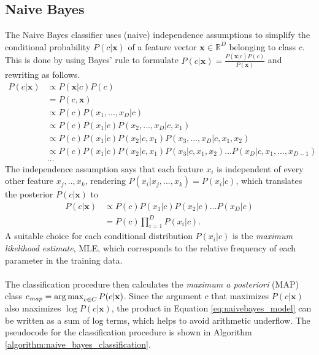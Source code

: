 \subsection{Naive Bayes}
The Naive Bayes classifier uses (naive) independence assumptions to simplify the conditional probability $P(c\vert\mathbf{x})$ of a feature vector $\mathbf{x} \in \mathbb{R}^D$ belonging to class $c$. This is done by using Bayes' rule to formulate $P(c\vert \mathbf{x}) = \frac{P(\mathbf{x}\vert c) P(c)}{P(\mathbf{x})}$ and rewriting as follows.
\begin{align*}
P(c\vert \mathbf{x}) &\propto P(\mathbf{x}\vert c)P(c)
\\&=P(c,\mathbf{x})
\\&\propto P(c) P(x_1,...,x_D\vert c)
\\&\propto P(c) P(x_1\vert c) P(x_2,...,x_D\vert c, x_1)
\\&\propto P(c) P(x_1\vert c) P(x_2\vert c, x_1) P(x_3,...,x_D\vert c,x_1,x_2)
\\&\propto P(c) P(x_1\vert c) P(x_2\vert c, x_1) P(x_3\vert c,x_1,x_2) \dots P(x_D\vert c, x_1,...,x_{D-1})
\\&\dots
\end{align*}
The independence assumption says that each feature $x_i$ is independent of every other feature $x_j,..,x_k$, rendering $P(x_i\vert x_j,...,x_k) = P(x_i\vert c)$, which translates the posterior $P(c\vert \mathbf{x})$ to
\begin{align}
P(c\vert \mathbf{x}) &\propto P(c) P(x_1\vert c) P(x_2\vert c) \dots P(x_D\vert c) \nonumber
\\&= P(c) \prod_{i=1}^{D} P(x_i\vert c).\label{eq:naivebayes_model}
\end{align}
A suitable choice for each conditional distribution $P(x_i\vert c)$ is the \textit{maximum likelihood estimate}, MLE, which corresponds to the relative frequency of each parameter in the training data.
\\\\
The classification procedure then calculates the \textit{maximum a posteriori} (MAP) class $c_{\textit{map}} = \operatorname*{arg\,max}_{c\in C} P(c\vert \mathbf{x})$. Since the argument $c$ that maximizes $P(c\vert \mathbf{x})$ also maximizes $\log P(c\vert \mathbf{x})$, the product in Equation \ref{eq:naivebayes_model} can be written as a sum of log terms, which helps to avoid arithmetic underflow. The pseudocode for the classification procedure is shown in Algorithm \ref{algorithm:naive_bayes_classification}.

